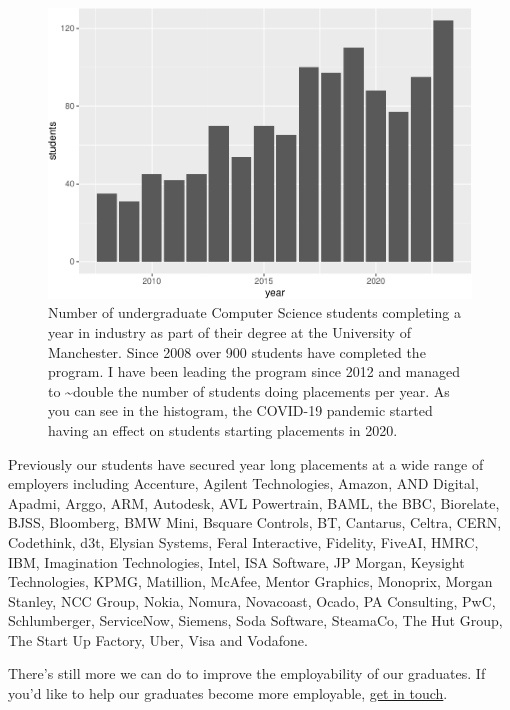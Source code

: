 \documentclass[
  12pt,
]{book}
\begin{document}
\begin{figure}

{\centering \includegraphics[width=1\linewidth]{duncan-hull_files/figure-latex/ie-fig-1} 

}

\caption{Number of undergraduate Computer Science students completing a year in industry as part of their degree at the University of Manchester. Since 2008 over 900 students have completed the program. I have been leading the program since 2012 and managed to \textasciitilde double the number of students doing placements per year. As you can see in the histogram, the COVID-19 pandemic started having an effect on students starting placements in 2020.}\label{fig:ie-fig}
\end{figure}



Previously our students have secured year long placements at a wide range of employers including Accenture, Agilent Technologies, Amazon, AND Digital, Apadmi, Arggo, ARM, Autodesk, AVL Powertrain, BAML, the BBC, Biorelate, BJSS, Bloomberg, BMW Mini, Bsquare Controls, BT, Cantarus, Celtra, CERN, Codethink, d3t, Elysian Systems, Feral Interactive, Fidelity, FiveAI, HMRC, IBM, Imagination Technologies, Intel, ISA Software, JP Morgan, Keysight Technologies, KPMG, Matillion, McAfee, Mentor Graphics, Monoprix, Morgan Stanley, NCC Group, Nokia, Nomura, Novacoast, Ocado, PA Consulting, PwC, Schlumberger, ServiceNow, Siemens, Soda Software, SteamaCo, The Hut Group, The Start Up Factory, Uber, Visa and Vodafone.

There's still more we can do to improve the employability of our graduates. If you'd like to help our graduates become more employable, \href{Contact}{get in touch}.
\end{document}
